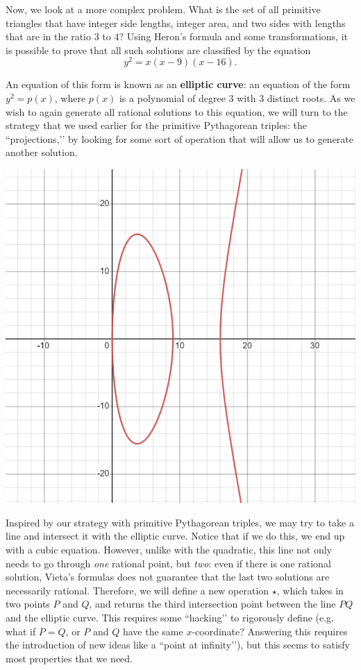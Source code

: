 \documentclass{article}
\begin{document}
Now, we look at a more complex problem. What is the set of all primitive triangles that have integer side lengths, integer area, and two sides with lengths that are in the ratio $3$ to $4$? Using Heron’s formula and some transformations, it is possible to prove that all such solutions are classified by the equation
\[y^2=x(x-9)(x-16).\]


An equation of this form is known as an \textbf{elliptic curve}: an equation of the form $y^2=p(x)$, where $p(x)$ is a polynomial of degree $3$ with $3$ distinct roots. As we wish to again generate all rational solutions to this equation, we will turn to the strategy that we used earlier for the primitive Pythagorean triples: the ``projections,’’ by looking for some sort of operation that will allow us to generate another solution.

\begin{center}
    \includegraphics[scale=0.4]{images/ellipticCurves.png}
\end{center}

Inspired by our strategy with primitive Pythagorean triples, we may try to take a line and intersect it with the elliptic curve. Notice that if we do this, we end up with a cubic equation. However, unlike with the quadratic, this line not only needs to go through \textit{one} rational point, but \textit{two}: even if there is one rational solution, Vieta’s formulas does not guarantee that the last two solutions are necessarily rational. Therefore, we will define a new operation $\star$, which takes in two points $P$ and $Q$, and returns the third intersection point between the line $PQ$ and the elliptic curve. This requires some ``hacking’’ to rigorously define (e.g. what if $P=Q$, or $P$ and $Q$ have the same $x$-coordinate? Answering this requires the introduction of new ideas like a ``point at infinity’’), but this seems to satisfy most properties that we need.
\end{document}
